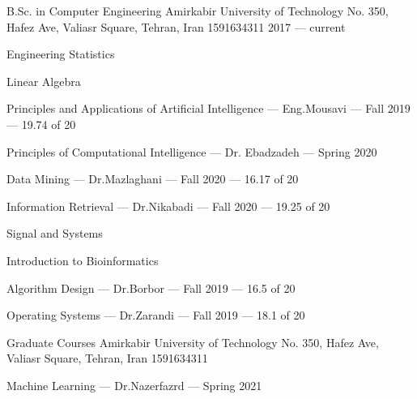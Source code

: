 

\begin{cventries}

  \cventry
    {B.Sc. in Computer Engineering} %
    {Amirkabir University of Technology} %
    {No. 350, Hafez Ave, Valiasr Square, Tehran, Iran 1591634311} %
    {2017 --- current} %
    {
        \begin{cvitems}
            \item Engineering Statistics
            \item Linear Algebra
            \item Principles and Applications of Artificial Intelligence --- Eng.Mousavi --- Fall 2019 --- 19.74 of 20
            \item Principles of Computational Intelligence --- Dr. Ebadzadeh --- Spring 2020
            \item Data Mining --- Dr.Mazlaghani --- Fall 2020 --- 16.17 of 20
            \item Information Retrieval --- Dr.Nikabadi --- Fall 2020 --- 19.25 of 20
            \item Signal and Systems
            \item Introduction to Bioinformatics
            \item Algorithm Design --- Dr.Borbor --- Fall 2019 --- 16.5 of 20
            \item Operating Systems --- Dr.Zarandi --- Fall 2019 --- 18.1 of 20
        \end{cvitems}
    }

    \cventry
    {Graduate Courses} %
    {Amirkabir University of Technology} %
    {No. 350, Hafez Ave, Valiasr Square, Tehran, Iran 1591634311} %
    {} %
    {
        \begin{cvitems}
            \item Machine Learning --- Dr.Nazerfazrd --- Spring 2021
        \end{cvitems}
    }

\end{cventries}
